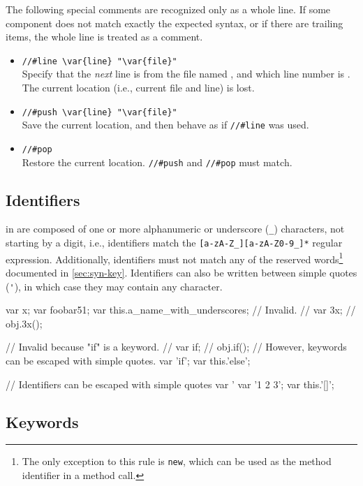 The following special comments are recognized only as a whole line.
If some component does not match exactly the expected syntax, or if
there are trailing items, the whole line is treated as a comment.
\begin{itemize}
\item \lstinline|//#line \var{line} "\var{file}"|\\
  Specify that the \emph{next} line is from the file named ,
  and which line number is .  The current location (i.e.,
  current file and line) is lost.

\item \lstinline|//#push \var{line} "\var{file}"|\\
  Save the current location, and then behave as if \lstinline|//#line|
  was used.

\item \lstinline|//#pop|\\
  Restore the current location.  \lstinline|//#push| and
  \lstinline|//#pop| must match.
\end{itemize}


\subsection{Identifiers}
\label{sec:us-syn-id}

 in \us are composed of one or more alphanumeric or
underscore (\lstinline|_|) characters, not starting by a digit, i.e.,
identifiers match the \lstinline|[a-zA-Z_][a-zA-Z0-9_]*| regular
expression.  Additionally, identifiers must not match any of the \us
reserved words\footnote{
  The only exception to this rule is \lstinline|new|, which can be
  used as the method identifier in a method call.
} documented in \autoref{sec:syn-key}. Identifiers can also be written
between simple quotes (\lstinline|'|), in which case they may contain
any character.

\begin{urbiscript}[firstnumber=last]
var x;
var foobar51;
var this.a_name_with_underscores;
// Invalid.
// var 3x;
// obj.3x();

// Invalid because "if" is a keyword.
// var if;
// obj.if();
// However, keywords can be escaped with simple quotes.
var 'if';
var this.'else';

// Identifiers can be escaped with simple quotes
var '%
var '1 2 3';
var this.'[]';
\end{urbiscript}

\subsection{Keywords}
\label{sec:syn-key}

